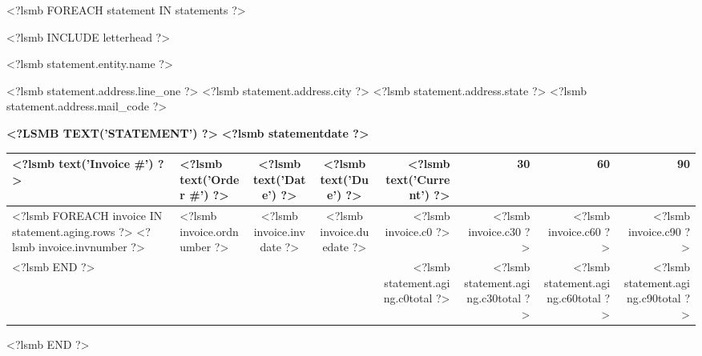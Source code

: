 \documentclass{scrartcl}
\begin{document}
<?lsmb FOREACH statement IN statements ?>
\pagestyle{myheadings}
\thispagestyle{empty}

\fontsize{10pt}{12pt}\selectfont

<?lsmb INCLUDE letterhead ?>

\parbox[t]{.5\textwidth}{
<?lsmb statement.entity.name ?>

<?lsmb statement.address.line_one ?>
<?lsmb statement.address.city ?> <?lsmb statement.address.state ?>
<?lsmb statement.address.mail_code ?>
}
\hfill

\vspace{1cm}

\textbf{\MakeUppercase{<?lsmb text('Statement') ?>}} \hfill
\textbf{<?lsmb statementdate ?>}

\vspace{2cm}

\begin{tabular*}{\textwidth}{|ll@{\extracolsep\fill}ccrrrr|}
  \hline
  \textbf{<?lsmb text('Invoice #') ?>} & \textbf{<?lsmb text('Order #') ?>}
  & \textbf{<?lsmb text('Date') ?>} & \textbf{<?lsmb text('Due') ?>} &
  \textbf{<?lsmb text('Current') ?>} & \textbf{30} & \textbf{60} & \textbf{90} \\
  \hline
<?lsmb FOREACH invoice IN statement.aging.rows ?>
  <?lsmb invoice.invnumber ?> &
  <?lsmb invoice.ordnumber ?> &
  <?lsmb invoice.invdate ?> &
  <?lsmb invoice.duedate ?> &
  <?lsmb invoice.c0 ?> &
  <?lsmb invoice.c30 ?> &
  <?lsmb invoice.c60 ?> &
  <?lsmb invoice.c90 ?> \\
<?lsmb END ?>
\hline
 & & & &
 <?lsmb statement.aging.c0total ?> &
 <?lsmb statement.aging.c30total ?> &
 <?lsmb statement.aging.c60total ?> &
 <?lsmb statement.aging.c90total ?> \\
\hline
\end{tabular*}

\vspace{0.5cm}

\hfill
\pagebreak
<?lsmb END ?>
\end{document}
